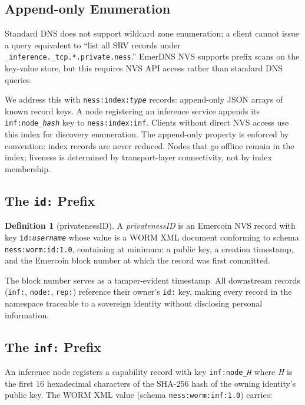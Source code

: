 \documentclass[11pt,a4paper]{article}
\theoremstyle{definition}
\newtheorem{definition}{Definition}[section]
\begin{document}
\subsection{Append-only Enumeration}
\label{sec:enumeration}

Standard DNS does not support wildcard zone enumeration; a client cannot
issue a query equivalent to ``list all SRV records under
\texttt{\_inference.\_tcp.*.private.ness}.''  EmerDNS NVS supports prefix
scans on the key-value store, but this requires NVS API access rather than
standard DNS queries.

We address this with \texttt{ness:index:\textit{type}} records: append-only
JSON arrays of known record keys.  A node registering an inference service
appends its \texttt{inf:node\_\textit{hash}} key to \texttt{ness:index:inf}.
Clients without direct NVS access use this index for discovery enumeration.
The append-only property is enforced by convention: index records are never
reduced.  Nodes that go offline remain in the index; liveness is determined
by transport-layer connectivity, not by index membership.

\subsection{The \texttt{id:} Prefix}
\label{sec:id-prefix}

\begin{definition}[privatenessID]
A \emph{privatenessID} is an Emercoin NVS record with key \texttt{id:\textit{username}}
whose value is a WORM XML document conforming to schema \texttt{ness:worm:id:1.0},
containing at minimum: a public key, a creation timestamp, and the Emercoin block
number at which the record was first committed.
\end{definition}

The block number serves as a tamper-evident timestamp.  All downstream records
(\texttt{inf:}, \texttt{node:}, \texttt{rep:}) reference their owner's
\texttt{id:} key, making every record in the namespace traceable to a sovereign
identity without disclosing personal information.

\subsection{The \texttt{inf:} Prefix}
\label{sec:inf-prefix}

An inference node registers a capability record with key
\texttt{inf:node\_\textit{H}} where \textit{H} is the first 16 hexadecimal
characters of the SHA-256 hash of the owning identity's public key.  The WORM
XML value (schema \texttt{ness:worm:inf:1.0}) carries:
\end{document}
